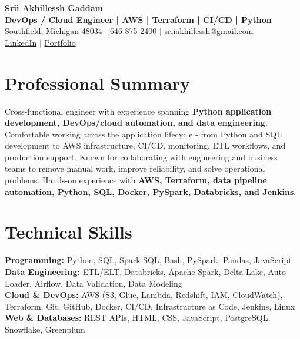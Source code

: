\documentclass[letterpaper,10pt]{article}
\begin{document}
\fontsize{9.35pt}{10.45pt}\selectfont

\begin{center}
    {\LARGE \textbf{Srii Akhillessh Gaddam}} \\[-1pt]
    \textbf{DevOps / Cloud Engineer | AWS | Terraform | CI/CD | Python} \\[2pt]
    Southfield, Michigan 48034 $|$
    \href{tel:6468752400}{646-875-2400} $|$
    \href{mailto:sriiakhillessh@gmail.com}{sriiakhillessh@gmail.com} \\[1pt]
    \href{https://www.linkedin.com/in/srii-akhiilessh-gaddam-b48668191/}{LinkedIn} $|$
    \href{https://sriiakhillesshg.github.io/portfolio/}{Portfolio}
\end{center}
\vspace{-8pt}

\section{Professional Summary}
\small{Cross-functional engineer with experience spanning \textbf{Python application development, DevOps/cloud automation, and data engineering}. Comfortable working across the application lifecycle - from Python and SQL development to AWS infrastructure, CI/CD, monitoring, ETL workflows, and production support. Known for collaborating with engineering and business teams to remove manual work, improve reliability, and solve operational problems. Hands-on experience with \textbf{AWS, Terraform, data pipeline automation, Python, SQL, Docker, PySpark, Databricks, and Jenkins}.}

\section{Technical Skills}
\small{
\textbf{Programming:} Python, SQL, Spark SQL, Bash, PySpark, Pandas, JavaScript \\
\textbf{Data Engineering:} ETL/ELT, Databricks, Apache Spark, Delta Lake, Auto Loader, Airflow, Data Validation, Data Modeling \\
\textbf{Cloud \& DevOps:} AWS (S3, Glue, Lambda, Redshift, IAM, CloudWatch), Terraform, Git, GitHub, Docker, CI/CD, Infrastructure as Code, Jenkins, Linux \\
\textbf{Web \& Databases:} REST APIs, HTML, CSS, JavaScript, PostgreSQL, Snowflake, Greenplum
}
\end{document}
